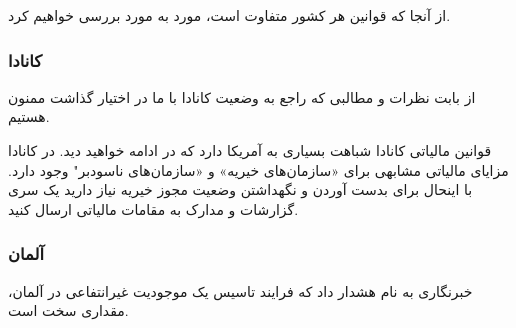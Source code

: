 از آنجا که قوانین هر کشور متفاوت است، مورد به مورد بررسی خواهیم کرد.
\subsubsection{کانادا}
از
بابت نظرات و مطالبی که راجع به وضعیت کانادا با ما در اختیار گذاشت ممنون هستیم.


قوانین مالیاتی کانادا شباهت بسیاری به آمریکا دارد که در ادامه خواهید دید.
در کانادا مزایای مالیاتی مشابهی برای «سازمان‌های خیریه» و «سازمان‌های ناسودبر"
وجود دارد. با اینحال برای بدست آوردن و نگهداشتن وضعیت مجوز خیریه نیاز دارید
یک سری گزارشات و مدارک به مقامات مالیاتی ارسال کنید.

\subsubsection{آلمان}

خبرنگاری به نام
هشدار داد که فرایند تاسیس یک موجودیت غیرانتفاعی در آلمان، مقداری سخت است.

